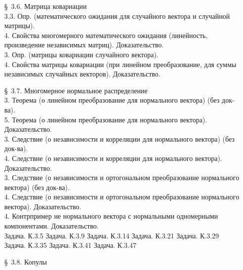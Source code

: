 \documentclass[10pt]{amsart}
\begin{document}
\begin{enumerate}
\begin{enumerate}
\item[\S\, 3.6.] Матрица ковариации \\
3.3. Опр. (математического ожидания для случайного вектора и случайной матрицы). \\
4. Свойства многомерного математического ожидания (линейность, произведение независимых матриц). Доказательство. \\ 
3. Опр. (матрицы ковариации случайного вектора). \\
4. Свойства матрицы ковариации (при линейном преобразование, для суммы независимых случайных векторов). Доказательство. \\


\item[\S\, 3.7.] Многомерное нормальное распределение \\

3. Теорема (о линейном преобразование для нормального вектора) (без док-ва). \\
5. Теорема (о линейном преобразование для нормального вектора). Доказательство. \\
3. Следствие (о независимости и корреляции для нормального вектора) (без док-ва). \\ 
4. Следствие (о независимости и корреляции для нормального вектора). Доказательство. \\ 
3. Следствие (о независимости и  ортогональном преобразование нормального вектора) (без док-ва). \\ 
4. Следствие (о независимости и  ортогональном преобразование нормального вектора). Доказательство. \\ 
4. Контрпример не нормального вектора с нормальными одномерными компонентами. Доказательство. \\ 
Задача. К.3.5
Задача. К.3.9
Задача. К.3.14
Задача. К.3.21
Задача. К.3.29
Задача. К.3.35
Задача. К.3.41
Задача. К.3.47

\item[\S\, 3.8.] Копулы \\
        

\end{enumerate}
\end{enumerate}
\end{document}
